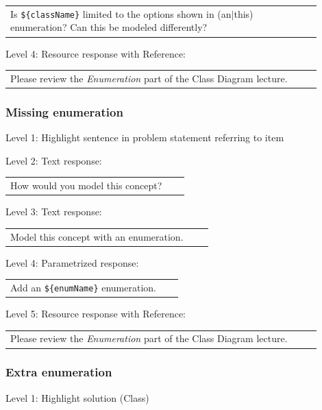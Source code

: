 \begin{tabular}{|p{0.9\linewidth}}
Is \verb|${className}| limited to the options shown in (an$|$this) enumeration? Can this be modeled differently?
\end{tabular} \medskip

\noindent Level 4: Resource response with Reference: \medskip

\begin{tabular}{|p{0.9\linewidth}}
Please review the \textit{Enumeration} part of the Class Diagram lecture.
\end{tabular} \medskip


\subsubsection{Missing enumeration}

\noindent Level 1: Highlight sentence in problem statement referring to item \medskip

\noindent Level 2: Text response: \medskip

\begin{tabular}{|p{0.9\linewidth}}
How would you model this concept?
\end{tabular} \medskip

\noindent Level 3: Text response: \medskip

\begin{tabular}{|p{0.9\linewidth}}
Model this concept with an enumeration.
\end{tabular} \medskip

\noindent Level 4: Parametrized response: \medskip

\begin{tabular}{|p{0.9\linewidth}}
Add an \verb|${enumName}| enumeration.
\end{tabular} \medskip

\noindent Level 5: Resource response with Reference: \medskip

\begin{tabular}{|p{0.9\linewidth}}
Please review the \textit{Enumeration} part of the Class Diagram lecture.
\end{tabular} \medskip


\subsubsection{Extra enumeration}

\noindent Level 1: Highlight solution (Class) \medskip

